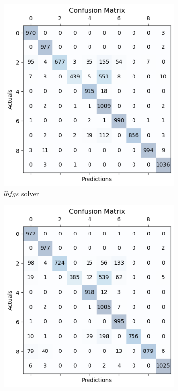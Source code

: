 \documentclass{article}
\begin{document}
\begin{titlepage}
  \begin{figure}[htbp]
    \centering
    \begin{subfigure}[t]{0.3\linewidth}
      \includegraphics[width=\linewidth]{LRMC(lbfgs).png}
      \caption{$lbfgs$ solver}
      \label{fig:sample6a}
    \end{subfigure}
    \hfill
    \begin{subfigure}[t]{0.3\linewidth}
      \includegraphics[width=\linewidth]{LRMC(liblinear).png}

\end{subfigure}
\end{figure}
\end{titlepage}
\end{document}

